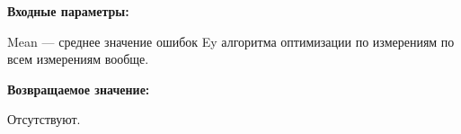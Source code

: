 \textbf{Входные параметры:}

Mean --- среднее значение ошибок Ey алгоритма оптимизации по измерениям по всем измерениям вообще.

\textbf{Возвращаемое значение:}

Отсутствуют.